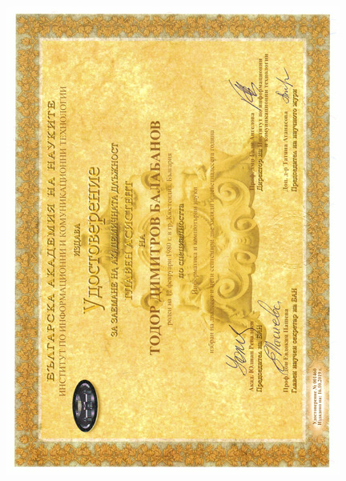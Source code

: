 \documentclass[bulgarian,a4paper]{europasscv}
\begin{document}
\includegraphics[width=\textwidth,height=\textheight,keepaspectratio]{IICT2019}
\end{document}
